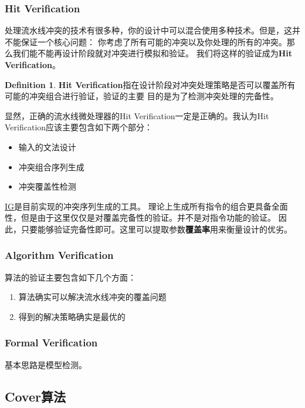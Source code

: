 \documentclass[hyperref,UTF8]{ctexart}
\theoremstyle{definition}
\newtheorem{defn}[thm]{Definition}
\theoremstyle{remark}
\numberwithin{equation}{subsection}
\newcommand{\Emph}{\textbf}
\begin{document}
\subsubsection{Hit Verification}

	处理流水线冲突的技术有很多种，你的设计中可以混合使用多种技术。但是，这并不能保证一个核心问题：
	你考虑了所有可能的冲突以及你处理的所有的冲突。那么我们能不能再设计阶段就对冲突进行模拟和验证。
	我们将这样的验证成为\Emph{Hit Verification}。
	
	\begin{defn}
	\label{defn:hit_verify}
	\Emph{Hit Verification}指在设计阶段对冲突处理策略是否可以覆盖所有可能的冲突组合进行验证，验证的主要
	目的是为了检测冲突处理的完备性。
	\end{defn}
	
	显然，正确的流水线微处理器的Hit Verification一定是正确的。我认为Hit Verification应该主要包含如下两个部分：
	\begin{itemize}
		\item 输入的文法设计
		\item 冲突组合序列生成
		\item 冲突覆盖性检测
	\end{itemize}
	\href{https://github.com/Turf1013/PPC_AutoTool/tree/master/IG}{IG}是目前实现的冲突序列生成的工具。
	理论上生成所有指令的组合更具备全面性，但是由于这里仅仅是对覆盖完备性的验证。并不是对指令功能的验证。
	因此，只要能够验证完备性即可。这里可以提取参数\Emph{覆盖率}用来衡量设计的优劣。

\subsubsection{Algorithm Verification}

	算法的验证主要包含如下几个方面：
	\begin{enumerate}[(1)]
		\item 算法确实可以解决流水线冲突的覆盖问题
		\item 得到的解决策略确实是最优的
	\end{enumerate}

\subsubsection{Formal Verification}

	基本思路是模型检测。
	

\subsection{Cover算法}	
\label{subsec:algo_cover}
\end{document}

